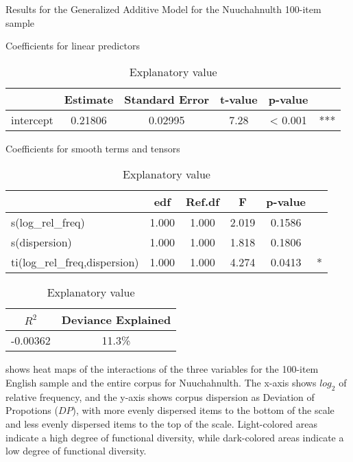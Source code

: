 \begin{table}[h!]

  \caption{Results for the Generalized Additive Model for the Nuuchahnulth 100-item sample}
  \label{tab:GAM-Nuu-100}

  \begin{subtable}[h]{\textwidth}
    \centering
    \caption{Coefficients for linear predictors}
    \begin{tabular}{ l c c c c c }
      {       } & Estimate & Standard Error & t-value & p-value & { }\\
      \midrule
      intercept & 0.21806  & 0.02995        & 7.28    & < 0.001 & ***\\
    \end{tabular}
  \end{subtable}

  \vspace{1em}

  \begin{subtable}[h]{\textwidth}
    \centering
    \caption{Coefficients for smooth terms and tensors}
    \begin{tabular}{ l c c c c c }
      { }                           & edf   & Ref.df & F     & p-value & { }\\
      \midrule
      s(log\_rel\_freq)             & 1.000 & 1.000  & 2.019 & 0.1586  & { }\\
      s(dispersion)                 & 1.000 & 1.000  & 1.818 & 0.1806  & { }\\
      ti(log\_rel\_freq,dispersion) & 1.000 & 1.000  & 4.274 & 0.0413  & *\\
    \end{tabular}
  \end{subtable}

  \vspace{1em}

  \begin{subtable}[h]{\textwidth}
    \centering
    \caption{Explanatory value}
    \begin{tabular}{ c c }
      $R^2$    & Deviance Explained\\
      \midrule
      -0.00362 & 11.3\%\\
    \end{tabular}
  \end{subtable}

\end{table}

 shows heat maps of the interactions of the three variables for the 100-item English sample and the entire corpus for Nuuchahnulth. The x-axis shows $log_2$ of relative frequency, and the y-axis shows corpus dispersion as Deviation of Propotions ($DP$), with more evenly dispersed items to the bottom of the scale and less evenly dispersed items to the top of the scale. Light-colored areas indicate a high degree of functional diversity, while dark-colored areas indicate a low degree of functional diversity.


